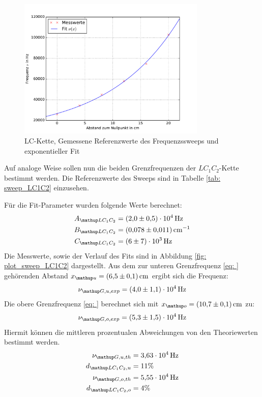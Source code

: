 \begin{figure}
  \centering
  \includegraphics[width = 0.8\textwidth]{../Messdaten/plots/frequenzsweep_LC.pdf}
  \caption{LC-Kette, Gemessene Referenzwerte des Frequenzssweeps und exponentieller Fit}
  \label{fig: plot_sweep_LC}
\end{figure}
Auf analoge Weise sollen nun die beiden Grenzfrequenzen der $LC_1C_2$-Kette bestimmt werden. Die Referenzwerte
des Sweeps sind in Tabelle \ref{tab: sweep_LC1C2} einzusehen.
\FloatBarrier

Für die Fit-Parameter wurden folgende Werte berechnet:
\begin{align}
  \begin{aligned}
    A\ua{LC_1C_2} &= \SI{2.0(5)e4}{\hertz}\\
    B\ua{LC_1C_2} &= \SI{0.078(11)}{\cm^{-1}}\\
    C\ua{LC_1C_2} &= \SI{6(7)e3}{\hertz}
  \end{aligned}
  \label{eq: params_LC1C2}
\end{align}
Die Messwerte, sowie der Verlauf des Fits sind in Abbildung \ref{fig: plot_sweep_LC1C2} dargestellt.
Aus dem zur unteren Grenzfrequenz \eqref{eq: } gehörenden Abstand $x\ua{u} = \SI{6.5(1)}{\cm}$ ergibt sich die Frequenz:
\begin{equation}
  \nu\ua{G, u, exp} = \SI{4.0(11)e4}{\hertz}
\end{equation}
Die obere Grenzfrequenz \eqref{eq: } berechnet sich mit $x\ua{o} = \SI{10.7(1)}{\cm}$ zu:
\begin{equation}
    \nu\ua{G, o, exp} = \SI{5.3(15)e4}{\hertz}
\end{equation}
Hiermit können die mittleren prozentualen Abweichungen von den Theoriewerten bestimmt werden.
\begin{align}
  \nu\ua{G,u,th} &= \SI{3.63e4}{\hertz}\\
  d\ua{LC_1C_2,u} &= 11 \%\\
  \nu\ua{G,o,th} &= \SI{5.55e4}{\hertz}\\
  d\ua{LC_1C_2, o} &= 4 \%
\end{align}
